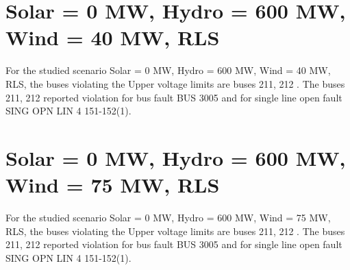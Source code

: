 \documentclass[10pt]{report}
\begin{document}
\section{Solar = 0 MW, Hydro = 600 MW, Wind = 40 MW, RLS}

For the studied scenario Solar = 0 MW, Hydro = 600 MW, Wind = 40 MW, RLS, the buses violating the Upper voltage limits are buses 211, 212 .
The buses 211, 212 reported violation for bus fault BUS 3005 and for single line open fault SING OPN LIN   4 151-152(1).
\begin{table}[H]
\caption{Contingencies reporting bus voltages greater than emergency voltage of 1.1 PU for scenario Solar = 0 MW, Hydro = 600 MW, Wind = 40 MW, RLS}
\label{HVSolar0MWHydro600MWWind40MWRLS}
\centering
{}
\end{table}

\section{Solar = 0 MW, Hydro = 600 MW, Wind = 75 MW, RLS}

For the studied scenario Solar = 0 MW, Hydro = 600 MW, Wind = 75 MW, RLS, the buses violating the Upper voltage limits are buses 211, 212 .
The buses 211, 212 reported violation for bus fault BUS 3005 and for single line open fault SING OPN LIN   4 151-152(1).
\begin{table}[H]
\caption{Contingencies reporting bus voltages greater than emergency voltage of 1.1 PU for scenario Solar = 0 MW, Hydro = 600 MW, Wind = 75 MW, RLS}
\label{HVSolar0MWHydro600MWWind75MWRLS}
\centering
{}
\end{table}
\end{document}

